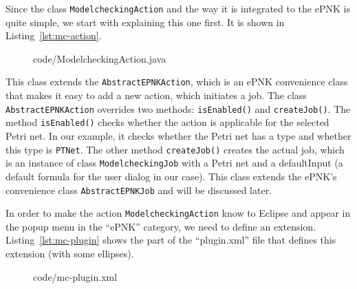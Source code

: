 Since the class {\tt ModelcheckingAction} and the way it is integrated to
the ePNK is quite simple, we start with explaining this one first. It is shown
in Listing~\ref{lst:mc-action}.
%
\begin{figure}[htbp!]
%
{code/ModelcheckingAction.java}
\end{figure}
%
This class extends the {\tt AbstractEPNKAction},%
which is an ePNK convenience class that makes it easy to add a new action,
which initiates a job. The class {\tt AbstractEPNKAction}
overrides two methods: {\tt isEnabled()} and {\tt createJob()}. The method
{\tt isEnabled()} checks whether the action is applicable for the selected Petri
net. In our example, it checks whether the Petri net has a type and whether this type
is {\tt PTNet}. The other method {\tt  createJob()} creates the actual job,
which is an instance of class {\tt ModelcheckingJob} with a Petri net and a
defaultInput (a default formula for the user dialog in our case). This class
extends the ePNK's convenience class {\tt AbstractEPNKJob}%
and will be discussed later.

In order to make the action {\tt ModelcheckingAction} know to Eclipse
and appear in the popup menu in the ``ePNK'' category, we need to define
an extension. Listing~\ref{lst:mc-plugin} shows the part of
the ``plugin.xml'' file that defines this extension (with some ellipses).
%
\begin{figure}[tbp!] %
%
{code/mc-plugin.xml}
\end{figure}

